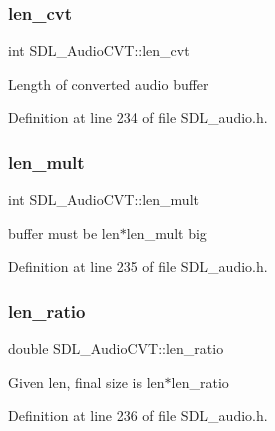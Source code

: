 \mbox{\label{struct_s_d_l___audio_c_v_t_a5c60163f34d1947e5b166c23aba9879d}} 
\subsubsection{\texorpdfstring{len\_cvt}{len\_cvt}}
{\footnotesize\ttfamily int S\+D\+L\+\_\+\+Audio\+C\+V\+T\+::len\+\_\+cvt}

Length of converted audio buffer 

Definition at line 234 of file S\+D\+L\+\_\+audio.\+h.

\mbox{\label{struct_s_d_l___audio_c_v_t_ac9662d47cf2348b82b27b151150116b0}} 
\subsubsection{\texorpdfstring{len\_mult}{len\_mult}}
{\footnotesize\ttfamily int S\+D\+L\+\_\+\+Audio\+C\+V\+T\+::len\+\_\+mult}

buffer must be len$\ast$len\+\_\+mult big 

Definition at line 235 of file S\+D\+L\+\_\+audio.\+h.

\mbox{\label{struct_s_d_l___audio_c_v_t_a5628ff5ccf711de9d77c0a4a9f57d2f0}} 
\subsubsection{\texorpdfstring{len\_ratio}{len\_ratio}}
{\footnotesize\ttfamily double S\+D\+L\+\_\+\+Audio\+C\+V\+T\+::len\+\_\+ratio}

Given len, final size is len$\ast$len\+\_\+ratio 

Definition at line 236 of file S\+D\+L\+\_\+audio.\+h.

\mbox{\label{struct_s_d_l___audio_c_v_t_ac600a035a48df05e14d3712fd6953ad4}} 
